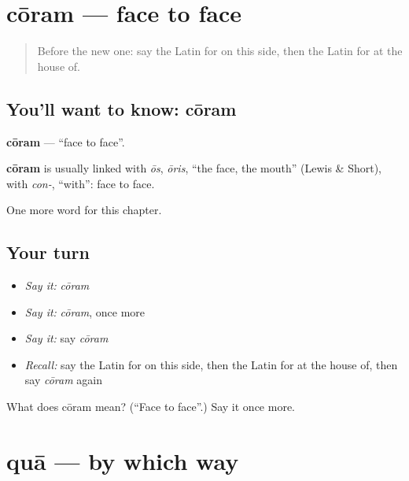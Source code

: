 \section[cōram]{cōram — face to face}

\label{lesson:LA-C238-coram}



\begin{quote}
Before the new one: say the Latin for on this side, then the Latin for at the house of.
\end{quote}

\subsection*{You'll want to know: cōram}
\textbf{cōram} — \textquotedblleft{}face to face\textquotedblright{}.

\begin{cousinweb}
\textbf{cōram} is usually linked with \emph{ōs}, \emph{ōris}, \textquotedblleft{}the face, the mouth\textquotedblright{} (Lewis \& Short), with \emph{con-}, \textquotedblleft{}with\textquotedblright{}: face to face.
\end{cousinweb}

\begin{grammarlens}[title={What you've built}]
One more word for this chapter.
\end{grammarlens}

\subsection*{Your turn}
\begin{itemize}
\raggedright
  \item \emph{Say it:} \emph{cōram}
  \item \emph{Say it:} \emph{cōram}, once more
  \item \emph{Say it:} say \emph{cōram}
  \item \emph{Recall:} say the Latin for on this side, then the Latin for at the house of, then say \emph{cōram} again
\end{itemize}

\begin{tcolorbox}[breakable,colback=teal!4,colframe=teal!35!black,title={Before you move on}]
What does cōram mean? (\textquotedblleft{}Face to face\textquotedblright{}.) Say it once more.
\end{tcolorbox}
\section[quā]{quā — by which way}

